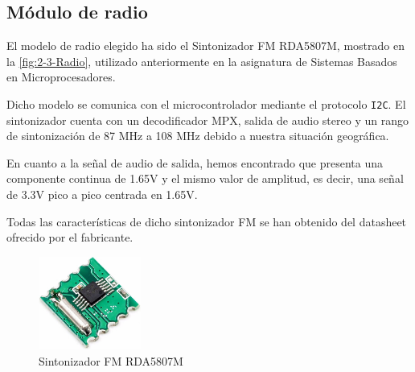 \subsection{Módulo de radio}
El modelo de radio elegido ha sido el Sintonizador FM RDA5807M, mostrado en la \autoref{fig:2-3-Radio},  utilizado anteriormente en la asignatura de Sistemas Basados en Microprocesadores.

Dicho modelo se comunica con el microcontrolador mediante el protocolo \texttt{I2C}. El sintonizador cuenta con un decodificador MPX, salida de audio stereo y un rango de sintonización de 87 MHz a 108 MHz debido a nuestra situación geográfica.

En cuanto a la señal de audio de salida, hemos encontrado que presenta una componente continua de 1.65V y el mismo valor de amplitud, es decir, una señal de 3.3V pico a pico centrada en 1.65V.

Todas las características de dicho sintonizador FM se han obtenido del datasheet ofrecido por el fabricante.

\begin{figure}[h]
    \centering
    \includegraphics[width=0.3\textwidth]{images/2/2-3/Radio.jpg}
    \caption{Sintonizador FM RDA5807M}
    \label{fig:2-3-Radio}
\end{figure}